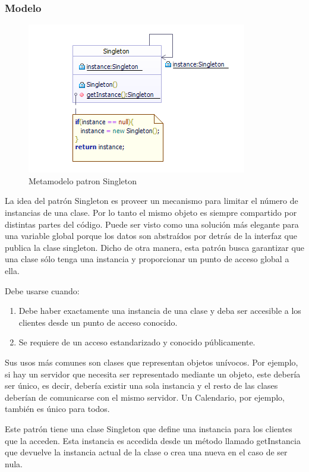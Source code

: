 \subsubsection{Modelo}
\begin{figure}[th!]
	\centering
	\includegraphics[width=0.7\linewidth]{arquitectura/imagenes/PatronSingelton}
	\caption{Metamodelo patron Singleton}
\end{figure}

La idea del patrón Singleton es proveer un mecanismo para limitar el número de instancias de una clase. Por lo tanto el mismo objeto es siempre compartido por distintas partes del código. Puede ser visto como una solución más elegante para una variable global porque los datos son abstraídos por detrás de la interfaz que publica la clase singleton.
Dicho de otra manera, esta patrón busca garantizar que una clase sólo tenga una instancia y proporcionar un punto de acceso global a ella.

Debe usarse cuando:
\begin{enumerate}
	\item Debe haber exactamente una instancia de una clase y deba ser accesible a los clientes desde un punto de acceso conocido.
	\item Se requiere de un acceso estandarizado y conocido públicamente.
\end{enumerate}
  

Sus usos más comunes son clases que representan objetos unívocos. Por ejemplo, si hay un servidor que necesita ser representado mediante un objeto, este debería ser único, es decir, debería existir una sola instancia y el resto de las clases deberían de comunicarse con el mismo servidor. Un Calendario, por ejemplo, también es único para todos.
\newline

Este patrón tiene una clase Singleton que define una instancia para los clientes que la acceden. Esta instancia es accedida desde un método llamado getInstancia que devuelve la instancia actual de la clase o crea una nueva en el caso de ser nula.

